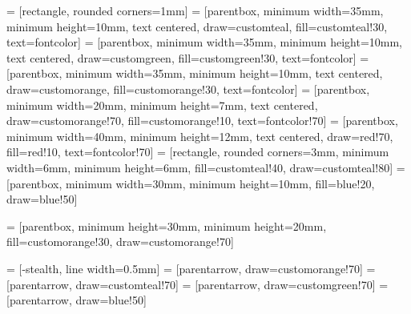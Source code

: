  = [rectangle, rounded corners=1mm] %
 = [parentbox, minimum width=35mm, minimum height=10mm, text centered, draw=customteal, fill=customteal!30, text=fontcolor]
 = [parentbox, minimum width=35mm, minimum height=10mm, text centered, draw=customgreen, fill=customgreen!30, text=fontcolor]
 = [parentbox, minimum width=35mm, minimum height=10mm, text centered, draw=customorange, fill=customorange!30, text=fontcolor]
 = [parentbox, minimum width=20mm, minimum height=7mm, text centered, draw=customorange!70, fill=customorange!10, text=fontcolor!70]
 = [parentbox, minimum width=40mm, minimum height=12mm, text centered, draw=red!70, fill=red!10, text=fontcolor!70]
 = [rectangle, rounded corners=3mm, minimum width=6mm, minimum height=6mm, fill=customteal!40, draw=customteal!80]
 = [parentbox, minimum width=30mm, minimum height=10mm, fill=blue!20, draw=blue!50]

 = [parentbox, minimum height=30mm, minimum height=20mm, fill=customorange!30, draw=customorange!70]

 = [-stealth, line width=0.5mm]
 = [parentarrow, draw=customorange!70]
 = [parentarrow, draw=customteal!70]
 = [parentarrow, draw=customgreen!70]
 = [parentarrow, draw=blue!50]


